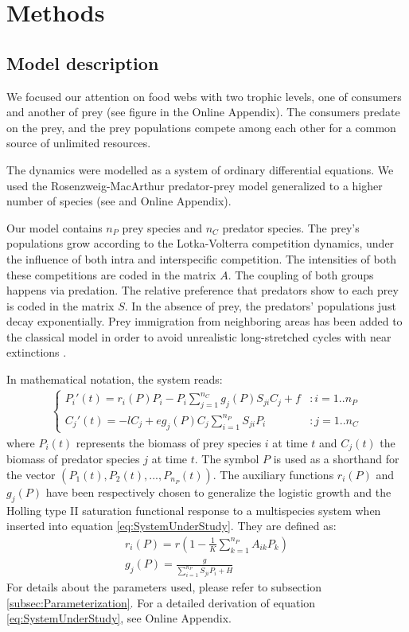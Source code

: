 \section{Methods}
\label{sec:Methods}

\subsection{Model description}
\label{subsec:Model}

We focused our attention on food webs with two trophic levels, one of consumers and another of prey (see figure in the Online Appendix). The consumers predate on the prey, and the prey populations compete among each other for a common source of unlimited resources.

The dynamics were modelled as a system of ordinary differential equations. We used the Rosenzweig-MacArthur predator-prey model  \citep{Rosenzweig1963} generalized to a higher number of species (see \citet{Scheffer2004} and Online Appendix).

Our model contains $n_P$ prey species and $n_C$ predator species. The prey's populations grow according to the Lotka-Volterra competition dynamics, under the influence of both intra and interspecific competition. The intensities of both these competitions are coded in the matrix $A$. The coupling of both groups happens via predation. The relative preference that predators show to each prey is coded in the matrix $S$. In the absence of prey, the predators' populations just decay exponentially. Prey immigration from neighboring areas has been added to the classical model in order to avoid unrealistic long-stretched cycles with near extinctions \citep{Scheffer2004}.

In mathematical notation, the system reads:
%
\begin{eqnarray}
\label{eq:SystemUnderStudy}
	\begin{cases}
	P_i'(t) =  r_i(P) P_i  - P_i \sum_{j = 1}^{n_C} g_j(P) S_{ji} C_j + f & : i = 1..n_P
	\\
	C_j'(t) = - l C_j +  e g_j(P) C_j \sum_{i = 1}^{n_P} S_{ji} P_i & : j = 1..n_C
	\end{cases}
\end{eqnarray}
%
where $P_i(t)$ represents the biomass of prey species $i$ at time $t$ and $C_j(t)$ the biomass of predator species $j$ at time $t$. The symbol $P$ is used as a shorthand for the vector $(P_1(t), P_2(t), ..., P_{n_P}(t))$. The auxiliary functions $r_i(P)$ and $g_j(P)$ have been respectively chosen to generalize the logistic growth and the Holling type II saturation functional response \citep{Edelstein-Keshet} to a multispecies system when inserted into equation \ref{eq:SystemUnderStudy}. They are defined as:
%
\begin{eqnarray}
\label{eq:HollingGenerator}
	r_i(P) = r \left( 1 - \frac{1}{K} \sum_{k=1}^{n_P} A_{ik} P_k \right)
	\\
	g_j(P) = \frac{g}{\sum_{i=1}^{n_P} S_{ji} P_i + H}
\end{eqnarray}
%
For details about the parameters used, please refer to subsection \ref{subsec:Parameterization}. For a detailed derivation of equation \ref{eq:SystemUnderStudy}, see Online Appendix.

